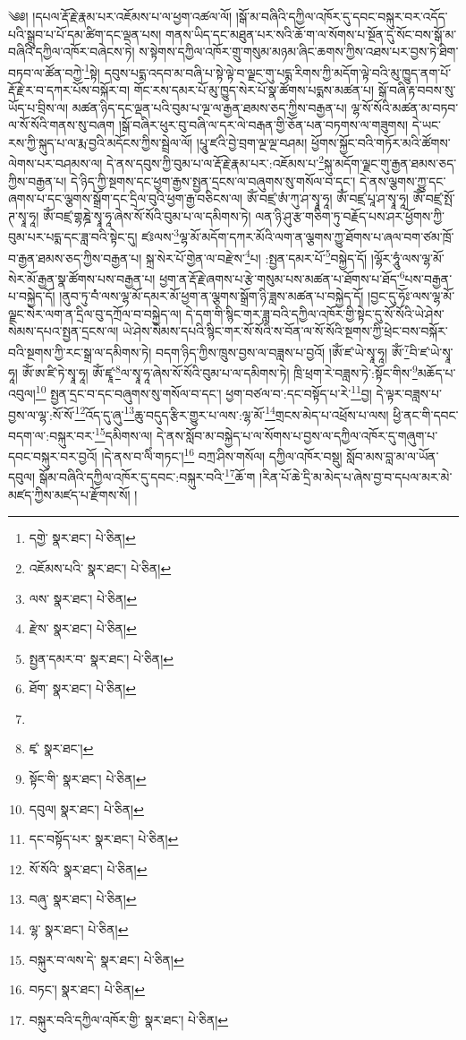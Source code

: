 \setcounter{footnote}{0} 
༄༅། །དཔལ་རྡོ་རྗེ་རྣམ་པར་འཇོམས་པ་ལ་ཕྱག་འཚལ་ལོ། །སྒོ་མ་བཞིའི་དཀྱིལ་འཁོར་དུ་དབང་བསྐུར་བར་འདོད་པའི་སྒྲུབ་པ་པོ་དམ་ཚིག་དང་ལྡན་པས། གནས་ཡིད་དང་མཐུན་པར་སའི་ཆོ་ག་ལ་སོགས་པ་སྔོན་དུ་སོང་བས་སྒོ་མ་བཞིའི་དཀྱིལ་འཁོར་བཞེངས་ཏེ། ས་སྟེགས་དཀྱིལ་འཁོར་གྲུ་གསུམ་མཉམ་ཞིང་ཆགས་ཀྱིས་འཐས་པར་བྱས་ཏེ་ཐིག་བཏབ་ལ་ཚོན་བཀྱེ་\footnote{དགྱེ་  སྣར་ཐང་།  པེ་ཅིན། }སྟེ། དབུས་པདྨ་འདབ་མ་བཞི་པ་སྟེ་ལྟེ་བ་ལྗང་གུ་པདྨ་རིགས་ཀྱི་མདོག་ལྟེ་བའི་མུ་ཁྱུད་ནག་པོ་རྡོ་རྗེ་ར་བ་དཀར་པོས་བསྐོར་བ། གོང་རས་དམར་པོ་མུ་ཁྱུད་སེར་པོ་སྣ་ཚོགས་པདྨས་མཚན་པ། སྒོ་བཞི་རྟ་བབས་སུ་ཡོད་པ་བྲིས་ལ། མཚན་ཉིད་དང་ལྡན་པའི་བུམ་པ་ལྔ་ལ་རྒྱན་ཐམས་ཅད་ཀྱིས་བརྒྱན་པ། ལྷ་སོ་སོའི་མཚན་མ་བཏབ་ལ་སོ་སོའི་གནས་སུ་བཞག །སྒོ་བཞིར་ཕུར་བུ་བཞི་ལ་དར་ལེ་བརྒན་གྱི་ཅོན་པན་བཏགས་ལ་གཟུགས། དེ་ཡང་རས་ཀྱི་སྐུད་པ་ལ་རྨ་བྱའི་མདོངས་ཀྱིས་སྦྲེལ་ལོ། །པཱུ་ཛའི་བྱེ་བྲག་ལྔ་ལྔ་བཤམ། ཕྱོགས་སྐྱོང་བའི་གཏོར་མའི་ཚོགས་ལེགས་པར་བཤམས་ལ། དེ་ནས་དབུས་ཀྱི་བུམ་པ་ལ་རྡོ་རྗེ་རྣམ་པར་:འཇོམས་པ་\footnote{འཇོམས་པའི་  སྣར་ཐང་།  པེ་ཅིན། }སྐུ་མདོག་ལྗང་གུ་རྒྱན་ཐམས་ཅད་ཀྱིས་བརྒྱན་པ། དེ་ཉིད་ཀྱི་སྔགས་དང་ཕྱག་རྒྱས་སྤྱན་དྲངས་ལ་བཞུགས་སུ་གསོལ་བ་དང་། དེ་ནས་ལྕགས་ཀྱུ་དང་ཞགས་པ་དང་ལྕགས་སྒྲོག་དང་དྲིལ་བུའི་ཕྱག་རྒྱ་བཅིངས་ལ། ཨོཾ་བཛྲ་ཨཾ་ཀུ་ཤ་སྭཱ་ཧཱ། ཨོཾ་བཛྲ་པཱ་ཤ་སྭཱ་ཧཱ། ཨོཾ་བཛྲ་སྤོ་ཊ་སྭཱ་ཧཱ། ཨོཾ་བཛྲ་གྷཎྜེ་སྭཱ་ཧཱ་ཞེས་སོ་སོའི་བུམ་པ་ལ་དམིགས་ཏེ། ལན་ཉི་ཤུ་རྩ་གཅིག་ཏུ་བརྗོད་པས་ཤར་ཕྱོགས་ཀྱི་བུམ་པར་པདྨ་དང་ཟླ་བའི་སྟེང་དུ། ཛཿལས་\footnote{ལས་  སྣར་ཐང་།  པེ་ཅིན། }ལྷ་མོ་མདོག་དཀར་མོའི་ལག་ན་ལྕགས་ཀྱུ་ཐོགས་པ་ཞལ་བག་ཙམ་ཁྲོ་བ་རྒྱན་ཐམས་ཅད་ཀྱིས་བརྒྱན་པ། སྐྲ་སེར་པོ་གྱེན་ལ་བརྫེས་\footnote{རྫེས་  སྣར་ཐང་།  པེ་ཅིན། }པ། :སྤྱན་དམར་པོ་\footnote{སྤྱན་དམར་བ་  སྣར་ཐང་།  པེ་ཅིན། }བསྐྱེད་དོ། །ལྷོར་ཧཱུཾ་ལས་ལྷ་མོ་སེར་མོ་རྒྱན་སྣ་ཚོགས་པས་བརྒྱན་པ། ཕྱག་ན་རྡོ་རྗེ་ཞགས་པ་རྩེ་གསུམ་པས་མཚན་པ་ཐོགས་པ་ཐོད་\footnote{ཐོག་  སྣར་ཐང་།  པེ་ཅིན། }པས་བརྒྱན་པ་བསྐྱེད་དོ། །ནུབ་ཏུ་བཾཾ་ལས་ལྷ་མོ་དམར་མོ་ཕྱག་ན་ལྕགས་སྒྲོག་ཉི་ཟླས་མཚན་པ་བསྐྱེད་དོ། །བྱང་དུ་ཧོཿ་ལས་ལྷ་མོ་ལྗང་སེར་ལག་ན་དྲིལ་བུ་དཀྲོལ་བ་བསྐྱེད་ལ། དེ་དག་གི་སྙིང་གར་ཟླ་བའི་དཀྱིལ་འཁོར་གྱི་སྟེང་དུ་སོ་སོའི་ཡེ་ཤེས་སེམས་དཔའ་སྤྱན་དྲངས་ལ། ཡེ་ཤེས་སེམས་དཔའི་སྙིང་གར་སོ་སོའི་ས་བོན་ལ་སོ་སོའི་སྔགས་ཀྱི་ཕྲེང་བས་བསྐོར་བའི་སྔགས་ཀྱི་རང་སྒྲ་ལ་དམིགས་ཏེ། བདག་ཉིད་ཀྱིས་ཁྲུས་བྱས་ལ་བཟླས་པ་བྱའོ། །ཨོཾ་ཛ་ཡེ་སྭཱ་ཧཱ། ཨོཾ་\footnote{}བི་ཛ་ཡེ་སྭཱ་ཧཱ། ཨོཾ་ཨ་ཛི་ཏེ་སྭཱ་ཧཱ། ཨོཾ་ཛྭཱ་\footnote{ཛྭ་  སྣར་ཐང་། }ལ་སྭཱ་ཧཱ་ཞེས་སོ་སོའི་བུམ་པ་ལ་དམིགས་ཏེ། ཁྲི་ཕྲག་རེ་བཟླས་ཏེ་:སྟོང་གིས་\footnote{སྟོང་གི་  སྣར་ཐང་།  པེ་ཅིན། }མཆོད་པ་འབུལ།\footnote{དབུལ།  སྣར་ཐང་།  པེ་ཅིན། } སྤྱན་དྲང་བ་དང་བཞུགས་སུ་གསོལ་བ་དང་། ཕྱག་བཙལ་བ་:དང་བསྟོད་པ་རེ་\footnote{དང་བསྟོད་པར་  སྣར་ཐང་།  པེ་ཅིན། }བྱ། དེ་ལྟར་བཟླས་པ་བྱས་ལ་ལྷ་:སོ་སོ་\footnote{སོ་སོའི་  སྣར་ཐང་།  པེ་ཅིན། }འོད་དུ་ཞུ་\footnote{བཞུ་  སྣར་ཐང་།  པེ་ཅིན། }ཆུ་བདུད་རྩིར་གྱུར་པ་ལས་:ལྷ་མོ་\footnote{ལྷ་  སྣར་ཐང་།  པེ་ཅིན། }གྲངས་མེད་པ་འཕྲོས་པ་ལས། ཕྱི་ནང་གི་དབང་བདག་ལ་:བསྐུར་བར་\footnote{བསྐུར་བ་ལས་དེ་  སྣར་ཐང་།  པེ་ཅིན། }དམིགས་ལ། དེ་ནས་སློབ་མ་བསྐྱེད་པ་ལ་སོགས་པ་བྱས་ལ་དཀྱིལ་འཁོར་དུ་གཞུག་པ་དབང་བསྐུར་བར་བྱའོ། །དེ་ནས་བ་ལིཾ་གཏང་།\footnote{བཏང་།  སྣར་ཐང་།  པེ་ཅིན། } བཀྲ་ཤིས་གསོལ། དཀྱིལ་འཁོར་བསྡུ། སློབ་མས་བླ་མ་ལ་ཡོན་དབུལ། སྒོམ་བཞིའི་དཀྱིལ་འཁོར་དུ་དབང་:བསྐུར་བའི་\footnote{བསྐུར་བའི་དཀྱིལ་འཁོར་གྱི་  སྣར་ཐང་།  པེ་ཅིན། }ཆོ་ག །རིན་པོ་ཆེ་དྲི་མ་མེད་པ་ཞེས་བྱ་བ་དཔལ་མར་མེ་མཛད་ཀྱིས་མཛད་པ་རྫོགས་སོ། ། 